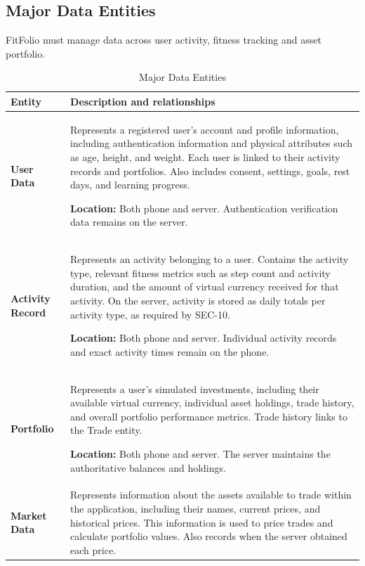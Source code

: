 \documentclass[12pt]{article}
\begin{document}
\subsection{Major Data Entities}

FitFolio must manage data across user activity, fitness tracking and
asset portfolio.

\begin{longtable}{@{}p{} p{}@{}}
\caption{Major Data Entities}
\label{tab:MajorDataEntities}\\

\toprule
\textbf{Entity} & \textbf{Description and relationships}\\
\midrule
\endfirsthead



\textbf{User Data} &
Represents a registered user's account and profile information,
including authentication information and physical attributes such
as age, height, and weight. Each user is linked to their activity
records and portfolios.
Also includes consent, settings, goals, rest days, and learning progress.

\textbf{Location:} Both phone and server. Authentication verification
data remains on the server.\\
\addlinespace

\textbf{Activity Record} &
Represents an activity belonging to a user. Contains the activity
type, relevant fitness metrics such as step count and activity
duration, and the amount of virtual currency received for that
activity.
On the server, activity is stored as daily totals per activity
type, as required by SEC-10.

\textbf{Location:} Both phone and server. Individual activity records
and exact activity times remain on the phone.\\
\addlinespace

\textbf{Portfolio} &
Represents a user's simulated investments, including their available
virtual currency, individual asset holdings, trade history, and
overall portfolio performance metrics.
Trade history links to the Trade entity.

\textbf{Location:} Both phone and server. The server maintains
the authoritative balances and holdings.\\
\addlinespace

\textbf{Market Data} &
Represents information about the assets available to trade within
the application, including their names, current prices, and
historical prices. This information is used to price trades and
calculate portfolio values.
Also records when the server obtained each price.


\end{longtable}
\end{document}
